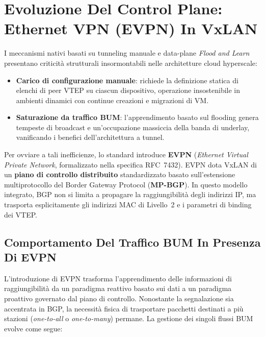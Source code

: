\documentclass[11pt, a4paper]{article}
\begin{document}
\newpage


\section{Evoluzione Del Control Plane: Ethernet VPN (EVPN) In VxLAN}

I meccanismi nativi basati su tunneling manuale e data-plane \emph{Flood and Learn} presentano criticità strutturali insormontabili nelle architetture cloud hyperscale:
\begin{itemize}[noitemsep]
    \item \textbf{Carico di configurazione manuale}: richiede la definizione statica di elenchi di peer VTEP su ciascun dispositivo, operazione insostenibile in ambienti dinamici con continue creazioni e migrazioni di VM.
    \item \textbf{Saturazione da traffico BUM}: l'apprendimento basato sul flooding genera tempeste di broadcast e un'occupazione massiccia della banda di underlay, vanificando i benefici dell'architettura a tunnel.
\end{itemize}

Per ovviare a tali inefficienze, lo standard introduce \textbf{EVPN} (\emph{Ethernet Virtual Private Network}, formalizzato nella specifica RFC~7432). EVPN dota VxLAN di un \textbf{piano di controllo distribuito} standardizzato basato sull'estensione multiprotocollo del Border Gateway Protocol (\textbf{MP-BGP}). In questo modello integrato, BGP non si limita a propagare la raggiungibilità degli indirizzi IP, ma trasporta esplicitamente gli indirizzi MAC di Livello~2 e i parametri di binding dei VTEP.

\subsection{Comportamento Del Traffico BUM In Presenza Di EVPN}

L'introduzione di EVPN trasforma l'apprendimento delle informazioni di raggiungibilità da un paradigma reattivo basato sui dati a un paradigma proattivo governato dal piano di controllo. Nonostante la segnalazione sia accentrata in BGP, la necessità fisica di trasportare pacchetti destinati a più stazioni (\emph{one-to-all} o \emph{one-to-many}) permane. La gestione dei singoli flussi BUM evolve come segue:
\end{document}
